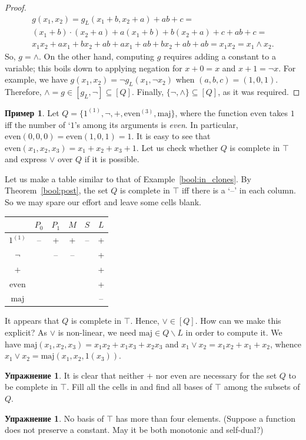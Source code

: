 \documentclass[12pt,notitlepage]{article}
\theoremstyle{plain}
\theoremstyle{definition}
\newtheorem{exc}[thm]{Упражнение}
\newtheorem{exm}[thm]{Пример}
\theoremstyle{plain}
\newcommand{\sbs}{\subseteq}
\renewcommand{\setminus}{\smallsetminus}
\newcommand{\1}{\mathbf{1}}
\newcommand{\0}{\mathbf{0}}
\begin{document}
\begin{proof}
\begin{multline*}
		g(x_1, x_2) = g_L(x_1 + b, x_2 + a) + ab + c =\\
		(x_1 + b)\cdot(x_2 + a) + a(x_1 + b) + b(x_2 + a) + c + ab + c =\\
		x_1 x_2 + a x_1 + b x_2 + ab + a x_1 + ab + b x_2 + ab + ab =
		x_1 x_2 = x_1 \wedge x_2.
	\end{multline*}
	So, $g = {\wedge}$. On the other hand, computing $g$ requires adding a constant to a variable; this boils down to applying negation for $x + 0 = x$ and $x + 1 = \neg x$. For example, we have $g(x_1, x_2) = \neg g_L(x_1, \neg x_2)$ when $(a,b,c) = (1, 0, 1)$. Therefore, ${\wedge} = g \in [g_L, {\neg}] \sbs [Q]$. Finally, $\{{\neg}, {\wedge}\} \sbs [Q]$, as it was required.
\end{proof}

\begin{exm}
	Let $Q = \{1^{(1)},{\neg},{+},\mathrm{even}^{(3)},\mathrm{maj}\}$, where the function $\mathrm{even}$ takes $1$ iff the number of `$1$'s among its arguments is \emph{even}. In particular, $\mathrm{even}(0, 0, 0) = \mathrm{even}(1, 0, 1) = 1$. It is easy to see that $\mathrm{even}(x_1,x_2,x_3) = x_1 + x_2 + x_3 +1$. Let us check whether $Q$ is complete in $\top$ and express $\vee$ over $Q$ if it is possible.
	
	Let us make a table similar to that of Example~\ref{bool:in_clones}. By Theorem~\ref{bool:post}, the set $Q$ is complete in $\top$ iff there is a `--' in each column. So we may spare our effort and leave some cells blank.
	\begin{center}
		{\large
			\begin{tabular}{|c|c|c|c|c|c|}
				\hline
				&$P_0$ & $P_1$ & $M$ & $S$ & $L$\\
				\hline
				$1^{(1)}$&--&+&+&--&+\\
				\hline
				$\neg$&&--&--&&+\\
				\hline
				$+$&&&&&+\\
				\hline
				$\mathrm{even}$&&&&&+\\
				\hline
				$\mathrm{maj}$&&&&&--\\
				\hline
			\end{tabular}
		}
	\end{center}
	It appears that $Q$ is complete in $\top$. Hence, ${\vee} \in [Q]$. How can we make this explicit? As ${\vee}$ is non-linear, we need $\mathrm{maj} \in Q \setminus L$ in order to compute it. We have $\mathrm{maj}(x_1, x_2, x_3) = x_1 x_2 + x_1 x_3 + x_2 x_3$ and $x_1 \vee x_2 = x_1 x_2 + x_1 + x_2$, whence
	$x_1 \vee x_2 = \mathrm{maj}(x_1,x_2,1(x_3))$.
\end{exm}
\begin{exc}
	It is clear that neither ${+}$ nor $\mathrm{even}$ are necessary for the set $Q$ to be complete in $\top$. Fill all the cells in and find all bases of $\top$ among the subsets of $Q$.
\end{exc}
\begin{exc}
	No basis of $\top$ has more than four elements. (Suppose a function does not preserve a constant. May it be both monotonic and self-dual?)
\end{exc}
\end{document}
